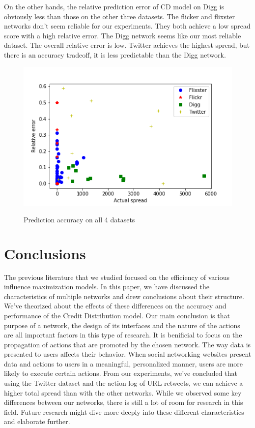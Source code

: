 \documentclass{acm_proc_article-sp}
\begin{document}
On the other hands, the relative prediction error of CD model on Digg is obviously less than those on the other three datasets. The flicker and flixster networks don't seem reliable for our experiments. They both achieve a low spread score with a high relative error. The Digg network seems like our most reliable dataset. The overall relative error is low. Twitter achieves the highest spread, but there is an accuracy tradeoff, it is less predictable than the Digg network.

\begin{figure}[h]
	\includegraphics[width=\linewidth]{accuracy.png}
	\centering
	\label{accuracy}
    \caption{Prediction accuracy on all 4 datasets}
\end{figure}


\section{Conclusions}

The previous literature that we studied focused on the efficiency of various influence maximization models. In this paper, we have discussed the characteristics of multiple networks and drew conclusions about their structure. We've theorized about the effects of these differences on the accuracy and performance of the Credit Distribution model.  Our main conclusion is that purpose of a network, the design of its interfaces and the nature of the actions are all important factors in this type of research. It is benificial to focus on the propagation of actions that are promoted by the chosen network. The way data is presented to users affects their behavior. When social networking websites present data and actions to users in a meaningful, personalized manner, users are more likely to execute certain actions. From our experiments, we've concluded that using the Twitter dataset and the action log of URL retweets, we can achieve a higher total spread than with the other networks. While we observed some key differences between our networks, there is still a lot of room for research in this field. Future research might dive more deeply into these different characteristics and elaborate further.
\end{document}
